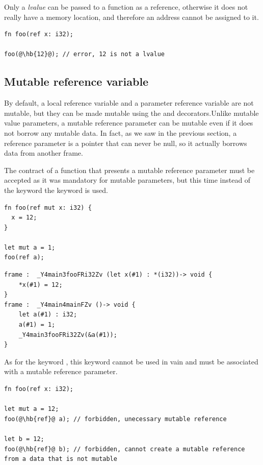 Only a \textit{lvalue} can be passed to a function as a reference, otherwise it
does not really have a memory location, and therefore an address cannot be
assigned to it.

\begin{lstlisting}[style=coloredverbatimError, escapechar=@]
fn foo(ref x: i32);

foo(@\hb{12}@); // error, 12 is not a lvalue
\end{lstlisting}

\subsection {Mutable reference variable}
\label{sec:mut_ref_param}

By default, a local reference variable and a parameter reference variable are
not mutable, but they can be made mutable using the  and 
decorators.Unlike mutable value parameters, a mutable reference parameter can be
mutable even if it does not borrow any mutable data. In fact, as we saw in the
previous section, a reference parameter is a pointer that can never be null, so
it actually borrows data from another frame.

The contract of a function that presents a mutable reference parameter must be
accepted as it was mandatory for mutable parameters, but this time instead of
the keyword  the keyword  is used.

\begin{lstlisting}[style=coloredverbatim]
fn foo(ref mut x: i32) {
  x = 12;
}

let mut a = 1;
foo(ref a);
\end{lstlisting}

\begin {lstlisting}[style=lyilVerb]
frame :  _Y4main3fooFRi32Zv (let x(#1) : *(i32))-> void {
    *x(#1) = 12;
}
frame :  _Y4main4mainFZv ()-> void {
    let a(#1) : i32;
    a(#1) = 1;
    _Y4main3fooFRi32Zv(&a(#1));
}
\end{lstlisting}

As for the keyword , this keyword  cannot be used in
vain and must be associated with a mutable reference parameter.

\begin{lstlisting}[style=coloredverbatimError, escapechar=@]
fn foo(ref x: i32);

let mut a = 12;
foo(@\hb{ref}@ a); // forbidden, unecessary mutable reference

let b = 12;
foo(@\hb{ref}@ b); // forbidden, cannot create a mutable reference from a data that is not mutable
\end{lstlisting}


